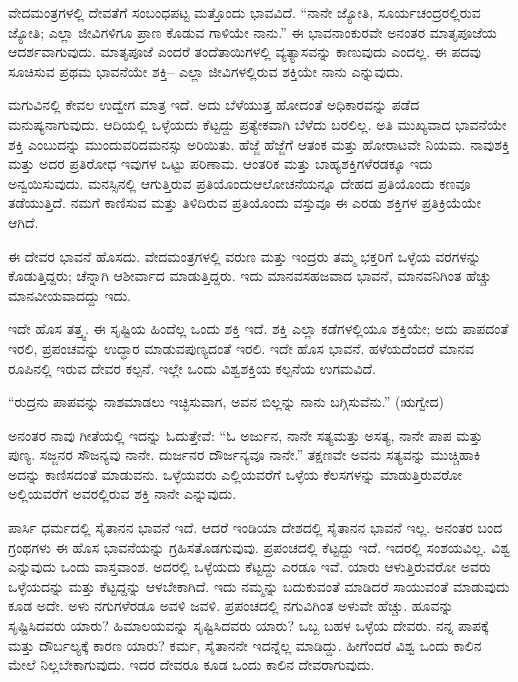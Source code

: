 ವೇದಮಂತ್ರಗಳಲ್ಲಿ ದೇವತೆಗೆ ಸಂಬಂಧಪಟ್ಟ ಮತ್ತೊಂದು ಭಾವವಿದೆ. “ನಾನೇ ಜ್ಯೋತಿ, ಸೂರ್ಯಚಂದ್ರರಲ್ಲಿರುವ ಜ್ಯೋತಿ; ಎಲ್ಲಾ ಜೀವಿಗಳಿಗೂ ಪ್ರಾಣ ಕೊಡುವ ಗಾಳಿಯೇ ನಾನು.” ಈ ಭಾವನಾಂಕುರವೇ ಅನಂತರ ಮಾತೃಪೂಜೆಯ ಆದರ್ಶವಾಗುವುದು. ಮಾತೃಪೂಜೆ ಎಂದರೆ ತಂದೆತಾಯಿಗಳಲ್ಲಿ ವ್ಯತ್ಯಾಸವನ್ನು ಕಾಣುವುದು ಎಂದಲ್ಲ. ಈ ಪದವು ಸೂಚಿಸುವ ಪ್ರಥಮ ಭಾವನೆಯೇ ಶಕ್ತಿ– ಎಲ್ಲಾ ಜೀವಿಗಳಲ್ಲಿರುವ ಶಕ್ತಿಯೇ ನಾನು ಎನ್ನುವುದು.

ಮಗುವಿನಲ್ಲಿ ಕೇವಲ ಉದ್ವೇಗ ಮಾತ್ರ ಇದೆ. ಅದು ಬೆಳೆಯುತ್ತ ಹೋದಂತೆ ಅಧಿಕಾರ\-ವನ್ನು ಪಡೆದ ಮನುಷ್ಯನಾಗುವುದು. ಆದಿಯಲ್ಲಿ ಒಳ್ಳೆಯದು ಕೆಟ್ಟದ್ದು ಪ್ರತ್ಯೇಕವಾಗಿ ಬೆಳೆದು ಬರಲಿಲ್ಲ. ಅತಿ ಮುಖ್ಯವಾದ ಭಾವನೆಯೇ ಶಕ್ತಿ ಎಂಬುದನ್ನು ಮುಂದುವರಿದ\break ಮನಸ್ಸು ಅರಿಯಿತು. ಹೆಜ್ಜೆ ಹೆಜ್ಜೆಗೆ ಆತಂಕ ಮತ್ತು ಹೋರಾಟವೇ ನಿಯಮ. ನಾವು\break ಶಕ್ತಿ ಮತ್ತು ಅದರ ಪ್ರತಿರೋಧ ಇವುಗಳ ಒಟ್ಟು ಪರಿಣಾಮ. ಆಂತರಿಕ ಮತ್ತು ಬಾಹ್ಯ\break ಶಕ್ತಿಗಳೆರಡಕ್ಕೂ ಇದು ಅನ್ವಯಿಸುವುದು. ಮನಸ್ಸಿನಲ್ಲಿ ಆಗುತ್ತಿರುವ ಪ್ರತಿಯೊಂದು\break ಆಲೋಚನೆಯನ್ನೂ ದೇಹದ ಪ್ರತಿಯೊಂದು ಕಣವೂ ತಡೆಯುತ್ತಿದೆ. ನಮಗೆ ಕಾಣಿಸುವ ಮತ್ತು ತಿಳಿದಿರುವ ಪ್ರತಿಯೊಂದು ವಸ್ತುವೂ ಈ ಎರಡು ಶಕ್ತಿಗಳ ಪ್ರತಿಕ್ರಿಯೆಯೇ ಆಗಿದೆ.

ಈ ದೇವರ ಭಾವನೆ ಹೊಸದು. ವೇದಮಂತ್ರಗಳಲ್ಲಿ ವರುಣ ಮತ್ತು ಇಂದ್ರರು ತಮ್ಮ ಭಕ್ತರಿಗೆ ಒಳ್ಳೆಯ ವರಗಳನ್ನು ಕೊಡುತ್ತಿದ್ದರು; ಚೆನ್ನಾಗಿ ಆಶೀರ್ವಾದ ಮಾಡುತ್ತಿದ್ದರು. ಇದು ಮಾನವಸಹಜವಾದ ಭಾವನೆ, ಮಾನವನಿಗಿಂತ ಹೆಚ್ಚು ಮಾನವೀಯವಾದದ್ದು ಇದು.

ಇದೇ ಹೊಸ ತತ್ತ್ವ. ಈ ಸೃಷ್ಟಿಯ ಹಿಂದೆಲ್ಲ ಒಂದು ಶಕ್ತಿ ಇದೆ. ಶಕ್ತಿ ಎಲ್ಲಾ ಕಡೆಗಳ\-ಲ್ಲಿಯೂ ಶಕ್ತಿಯೇ; ಅದು ಪಾಪದಂತೆ ಇರಲಿ, ಪ್ರಪಂಚವನ್ನು ಉದ್ಧಾರ ಮಾಡುವ\break ಪುಣ್ಯದಂತೆ ಇರಲಿ. ಇದೇ ಹೊಸ ಭಾವನೆ. ಹಳೆಯದೆಂದರೆ ಮಾನವ ರೂಪಿನಲ್ಲಿ ಇರುವ ದೇವರ ಕಲ್ಪನೆ. ಇಲ್ಲೇ ಒಂದು ವಿಶ್ವಶಕ್ತಿಯ ಕಲ್ಪನೆಯ ಉಗಮವಿದೆ.

“ರುದ್ರನು ಪಾಪವನ್ನು ನಾಶಮಾಡಲು ಇಚ್ಛಿಸುವಾಗ, ಅವನ ಬಿಲ್ಲನ್ನು ನಾನು ಬಗ್ಗಿಸುವೆನು.” (ಋಗ್ವೇದ)

ಅನಂತರ ನಾವು ಗೀತೆಯಲ್ಲಿ ಇದನ್ನು ಓದುತ್ತೇವೆ: “ಓ ಅರ್ಜುನ, ನಾನೇ ಸತ್ಯ\break ಮತ್ತು ಅಸತ್ಯ, ನಾನೇ ಪಾಪ ಮತ್ತು ಪುಣ್ಯ. ಸಜ್ಜನರ ಸೌಜನ್ಯವು ನಾನೇ. ದುರ್ಜನರ ದೌರ್ಜನ್ಯವೂ ನಾನೇ.” ತಕ್ಷಣವೇ ಅವನು ಸತ್ಯವನ್ನು ಮುಚ್ಚಿಹಾಕಿ ಅದನ್ನು ಕಾಣಿಸದಂತೆ ಮಾಡುವನು. ಒಳ್ಳೆಯವರು ಎಲ್ಲಿಯವರೆಗೆ ಒಳ್ಳೆಯ ಕೆಲಸಗಳನ್ನು ಮಾಡುತ್ತಿರುವರೋ ಅಲ್ಲಿಯವರೆಗೆ ಅವರಲ್ಲಿರುವ ಶಕ್ತಿ ನಾನೇ ಎನ್ನುವುದು.

ಪಾರ್ಸಿ ಧರ್ಮದಲ್ಲಿ ಸೈತಾನನ ಭಾವನೆ ಇದೆ. ಆದರೆ ಇಂಡಿಯಾ ದೇಶದಲ್ಲಿ ಸೈತಾನನ ಭಾವನೆ ಇಲ್ಲ. ಅನಂತರ ಬಂದ ಗ್ರಂಥಗಳು ಈ ಹೊಸ ಭಾವನೆಯನ್ನು ಗ್ರಹಿಸತೊಡಗುವುವು. ಪ್ರಪಂಚದಲ್ಲಿ ಕೆಟ್ಟದ್ದು ಇದೆ. ಇದರಲ್ಲಿ ಸಂಶಯವಿಲ್ಲ. ವಿಶ್ವ ಎನ್ನುವುದು ಒಂದು ವಾಸ್ತವಾಂಶ. ಅದರಲ್ಲಿ ಒಳ್ಳೆಯದು ಕೆಟ್ಟದ್ದು ಎರಡೂ ಇವೆ. ಯಾರು ಆಳುತ್ತಿರುವರೋ ಅವರು ಒಳ್ಳೆಯದನ್ನು ಮತ್ತು ಕೆಟ್ಟದ್ದನ್ನು ಆಳಬೇಕಾಗಿದೆ. ಇದು ನಮ್ಮನ್ನು ಬದುಕುವಂತೆ ಮಾಡಿದರೆ ಸಾಯುವಂತೆ ಮಾಡುವುದು ಕೂಡ ಅದೇ. ಅಳು ನಗುಗಳೆರಡೂ ಅವಳಿ ಜವಳಿ. ಪ್ರಪಂಚದಲ್ಲಿ ನಗುವಿಗಿಂತ ಅಳುವೇ ಹೆಚ್ಚು. ಹೂವನ್ನು ಸೃಷ್ಟಿಸಿದವರು ಯಾರು? ಹಿಮಾಲಯವನ್ನು ಸೃಷ್ಟಿಸಿದವರು ಯಾರು? ಒಬ್ಬ ಬಹಳ ಒಳ್ಳೆಯ ದೇವರು. ನನ್ನ ಪಾಪಕ್ಕೆ ಮತ್ತು ದೌರ್ಬಲ್ಯಕ್ಕೆ ಕಾರಣ ಯಾರು? ಕರ್ಮ, ಸೈತಾನನೇ ಇದನ್ನೆಲ್ಲ ಮಾಡಿದ್ದು. ಹೀಗೆಂದರೆ ವಿಶ್ವ ಒಂದು ಕಾಲಿನ ಮೇಲೆ ನಿಲ್ಲಬೇಕಾಗುವುದು. ಇದರ ದೇವರೂ ಕೂಡ ಒಂದು ಕಾಲಿನ ದೇವರಾಗುವುದು.

